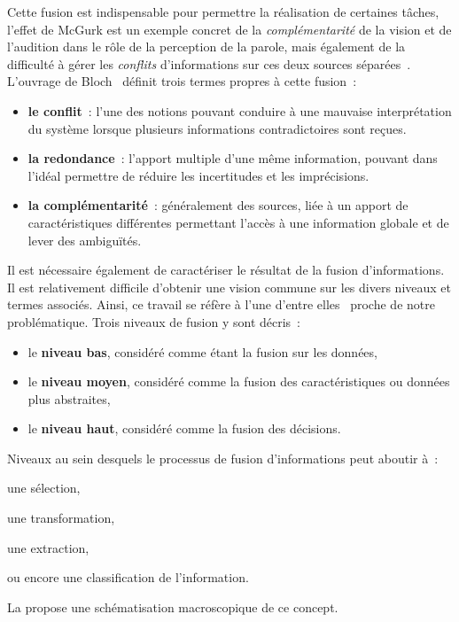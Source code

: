 Cette fusion est indispensable pour permettre la réalisation de certaines tâches, l'effet de McGurk est un exemple concret de la \textit{complémentarité} de la vision et de l'audition dans le rôle de la perception de la parole, mais également de la difficulté à gérer les \textit{conflits} d'informations sur ces deux sources séparées~\cite{Mcgurk1976}. L'ouvrage de Bloch~\cite{Bloch2003} définit trois termes propres à cette fusion~:
\begin{itemize}
    \item \textbf{le conflit}~: l'une des notions pouvant conduire à une mauvaise interprétation du système lorsque plusieurs informations contradictoires sont reçues.
    \item \textbf{la redondance}~: l'apport multiple d'une même information, pouvant dans l'idéal permettre de réduire les incertitudes et les imprécisions.
    \item \textbf{la complémentarité}~: généralement des sources, liée à un apport de caractéristiques différentes permettant l'accès à une information globale et de lever des ambiguïtés.
\end{itemize}\par

Il est nécessaire également de caractériser le résultat de la fusion d'informations. Il est relativement difficile d'obtenir une vision commune sur les divers niveaux et termes associés. Ainsi, ce travail se réfère à l'une d'entre elles~\cite{Dasarathy1997} proche de notre problématique. Trois niveaux de fusion y sont décris~:
\begin{itemize}
    \item le \textbf{niveau bas}, considéré comme étant la fusion sur les données,
    \item le \textbf{niveau moyen}, considéré comme la fusion des caractéristiques ou données plus abstraites,
    \item le \textbf{niveau haut}, considéré comme la fusion des décisions.
\end{itemize} Niveaux au sein desquels le processus de fusion d'informations peut aboutir à~:
\begin{inlinerate}
    \item une sélection,
    \item une transformation,
    \item une extraction,
    \item ou encore une classification de l'information.
\end{inlinerate} La  propose une schématisation macroscopique de ce concept.\par
 
